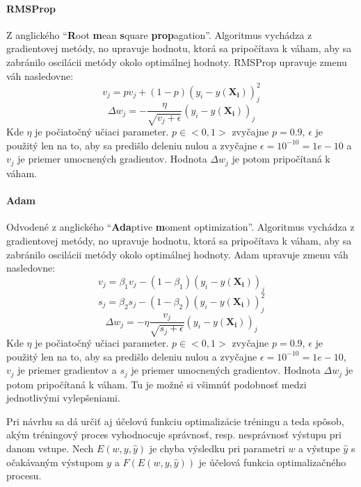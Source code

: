 \paragraph{RMSProp}\cite{algo_ann_optimizer_rmsprop}
Z anglického \enquote{\textbf{R}oot \textbf{m}ean \textbf{s}quare \textbf{prop}agation}.
Algoritmus vychádza z gradientovej metódy, no upravuje hodnotu, ktorá sa pripočítava k váham, aby sa zabránilo oscilácii
metódy okolo optimálnej hodnoty.
RMSProp upravuje zmenu váh nasledovne:
\begin{equation}
    v_j=pv_j+(1-p)(y_i-y(\mathbf{X_i}))_j^2
\end{equation}
\begin{equation}
    \Delta{w_j}=-\frac{\eta}{\sqrt{v_j+\epsilon}}(y_i-y(\mathbf{X_i}))_j
\end{equation}
Kde $\eta$ je počiatočný učiaci parameter.
$p \in <0,1>$ zvyčajne $p=0.9$, $\epsilon$ je použitý len na to, aby sa predišlo deleniu nulou a zvyčajne
$\epsilon = 10^{-10} = 1e-10$ a $v_j$ je priemer umocnených gradientov.
Hodnota $\Delta{w_j}$ je potom pripočítaná k váham.
\paragraph{Adam}\cite{algo_ann_optimizer_adam}
Odvodené z anglického \enquote{\textbf{Ada}ptive \textbf{m}oment optimization}.
Algoritmus vychádza z gradientovej metódy, no upravuje hodnotu, ktorá sa pripočítava k váham, aby sa zabránilo oscilácii
metódy okolo optimálnej hodnoty.
Adam upravuje zmenu váh nasledovne:
\begin{equation}
    v_j=\beta_1{v_j}-(1-\beta_1)(y_i-y(\mathbf{X_i}))_j
\end{equation}
\begin{equation}
    s_j=\beta_2{s_j}-(1-\beta_2)(y_i-y(\mathbf{X_i}))_j^2
\end{equation}
\begin{equation}
    \Delta{w_j}=-\eta\frac{v_j}{\sqrt{s_j+\epsilon}}(y_i-y(\mathbf{X_i}))_j
\end{equation}
Kde $\eta$ je počiatočný učiaci parameter.
$p \in <0,1>$ zvyčajne $p=0.9$, $\epsilon$ je použitý len na to, aby sa predišlo deleniu nulou a zvyčajne
$\epsilon = 10^{-10} = 1e-10$, $v_j$ je priemer gradientov a $s_j$ je priemer umocnených gradientov.
Hodnota $\Delta{w_j}$ je potom pripočítaná k váham.
Tu je možné si všimnúť podobnosť medzi jednotlivými vylepšeniami.

Pri návrhu sa dá určiť aj účelovú funkciu optimalizácie tréningu a teda spôsob, akým tréningový proces vyhodnocuje
správnosť, resp. nesprávnosť výstupu pri danom vstupe.
Nech $E(w, y, \hat{y})$ je chyba výsledku pri parametri $w$ a výstupe $\hat{y}$ s očakávaným výstupom $y$
a $F(E(w, y, \hat{y}))$ je účelová funkcia optimalizačného procesu.
